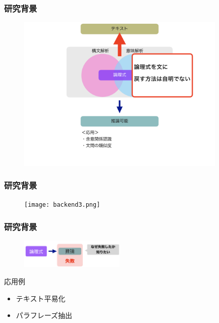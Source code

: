 \documentclass[dvipdfmx,cjk]{beamer}
\begin{document}
\begin{frame}
\frametitle{研究背景}
\begin{center}
\begin{figure}[h]
	\includegraphics[width=10cm]{backend2.png}
        \label{fig:backend2}
\end{figure}
\end{center}
\end{frame}

\begin{frame}
\frametitle{研究背景}
\begin{center}
\begin{figure}[h]
	\texttt{[image: backend3.png]}
        \label{fig:backend3}
\end{figure}
\end{center}
\end{frame}

\begin{frame}
\frametitle{研究背景}
\begin{center}
\begin{figure}[h]
	\includegraphics[width=5cm]{backend4.png}
        \label{fig:backend4}
\end{figure}
\end{center}
\begin{block}{応用例}
  \begin{itemize}
    \item テキスト平易化
    \item パラフレーズ抽出
  \end{itemize}
\end{block}

\end{frame}
\end{document}
